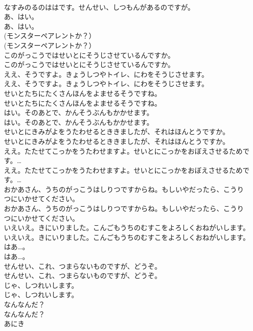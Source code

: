 \documentclass[8pt]{extreport}
\begin{document}
\begin{CJK}{UTF8}{min}
\\	なすみのるのははです。せんせい、しつもんがあるのですが。
\\	あ、はい。
\\	あ、はい。
\\	(モンスターペアレントか？）
\\	(モンスターペアレントか？）
\\	このがっこうではせいとにそうじさせているんですか。
\\	このがっこうではせいとにそうじさせているんですか。
\\	ええ、そうですよ。きょうしつやトイレ、にわをそうじさせます。
\\	ええ、そうですよ。きょうしつやトイレ、にわをそうじさせます。
\\	せいとたちにたくさんほんをよませるそうですね。
\\	せいとたちにたくさんほんをよませるそうですね。
\\	はい。そのあとで、かんそうぶんもかかせます。
\\	はい。そのあとで、かんそうぶんもかかせます。
\\	せいとにきみがよをうたわせるとききましたが、それはほんとうですか。
\\	せいとにきみがよをうたわせるとききましたが、それはほんとうですか。
\\	ええ。たたせてこっかをうたわせますよ。せいとにこっかをおぼえさせるためです。…
\\	ええ。たたせてこっかをうたわせますよ。せいとにこっかをおぼえさせるためです。…
\\	おかあさん、うちのがっこうはしりつですからね。もしいやだったら、こうりつにいかせてください。
\\	おかあさん、うちのがっこうはしりつですからね。もしいやだったら、こうりつにいかせてください。
\\	いえいえ。きにいりました。こんごもうちのむすこをよろしくおねがいします。
\\	いえいえ。きにいりました。こんごもうちのむすこをよろしくおねがいします。
\\	はあ…。
\\	はあ…。
\\	せんせい、これ、つまらないものですが、どうぞ。
\\	せんせい、これ、つまらないものですが、どうぞ。
\\	じゃ、しつれいします。
\\	じゃ、しつれいします。
\\	なんなんだ？
\\	なんなんだ？
\\	あにき

\end{CJK}
\end{document}
